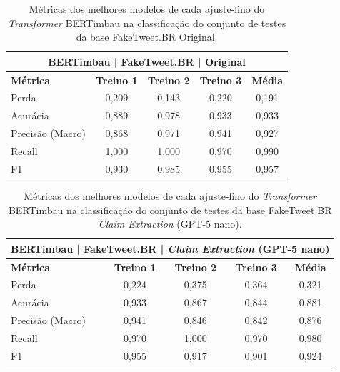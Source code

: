 \begin{table}[!htbp]
\centering
\begin{tabular}{l*4c}
\toprule
\multicolumn{5}{c}{\textbf{BERTimbau | FakeTweet.BR | Original}} \\ 
\midrule
\textbf{Métrica} & \textbf{Treino 1} & \textbf{Treino 2} & \textbf{Treino 3} & \textbf{Média} \\ 
\midrule
Perda & 0,209 & 0,143 & 0,220 & 0,191 \\ 
Acurácia & 0,889 & 0,978 & 0,933 & 0,933 \\ 
Precisão (Macro) & 0,868 & 0,971 & 0,941 & 0,927 \\ 
Recall & 1,000 & 1,000 & 0,970 & 0,990 \\ 
F1 & 0,930 & 0,985 & 0,955 & 0,957 \\ 
\bottomrule
\end{tabular}
\caption{Métricas dos melhores modelos de cada ajuste-fino do \textit{Transformer} BERTimbau na classificação do conjunto de testes da base FakeTweet.BR Original.}
\end{table}

\begin{table}[!htbp]
\centering
\begin{tabular}{l*4c}
\toprule
\multicolumn{5}{c}{\textbf{BERTimbau | FakeTweet.BR | \textit{Claim Extraction} (GPT-5 nano)}} \\ 
\midrule
\textbf{Métrica} & \textbf{Treino 1} & \textbf{Treino 2} & \textbf{Treino 3} & \textbf{Média} \\ 
\midrule
Perda & 0,224 & 0,375 & 0,364 & 0,321 \\ 
Acurácia & 0,933 & 0,867 & 0,844 & 0,881 \\ 
Precisão (Macro) & 0,941 & 0,846 & 0,842 & 0,876 \\ 
Recall & 0,970 & 1,000 & 0,970 & 0,980 \\ 
F1 & 0,955 & 0,917 & 0,901 & 0,924 \\ 
\bottomrule
\end{tabular}
\caption{Métricas dos melhores modelos de cada ajuste-fino do \textit{Transformer} BERTimbau na classificação do conjunto de testes da base FakeTweet.BR \textit{Claim Extraction} (GPT-5 nano).}
\end{table}


